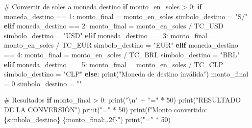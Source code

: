 \documentclass[
  doc,
  floatsintext,
  longtable,
  a4paper,
  nolmodern,
  notxfonts,
  notimes,
  12pt,
  colorlinks=true,linkcolor=blue,citecolor=blue,urlcolor=blue]{apa7}
\newenvironment{Shaded}{\begin{snugshade}}{\end{snugshade}}
\newcommand{\BuiltInTok}[1]{\textcolor[rgb]{0.00,0.23,0.31}{#1}}
\newcommand{\CharTok}[1]{\textcolor[rgb]{0.13,0.47,0.30}{#1}}
\newcommand{\CommentTok}[1]{\textcolor[rgb]{0.37,0.37,0.37}{#1}}
\newcommand{\ControlFlowTok}[1]{\textcolor[rgb]{0.00,0.23,0.31}{\textbf{#1}}}
\newcommand{\DecValTok}[1]{\textcolor[rgb]{0.68,0.00,0.00}{#1}}
\newcommand{\NormalTok}[1]{\textcolor[rgb]{0.00,0.23,0.31}{#1}}
\newcommand{\OperatorTok}[1]{\textcolor[rgb]{0.37,0.37,0.37}{#1}}
\newcommand{\SpecialCharTok}[1]{\textcolor[rgb]{0.37,0.37,0.37}{#1}}
\newcommand{\SpecialStringTok}[1]{\textcolor[rgb]{0.13,0.47,0.30}{#1}}
\newcommand{\StringTok}[1]{\textcolor[rgb]{0.13,0.47,0.30}{#1}}
\begin{document}
\begin{Shaded}
\begin{Highlighting}[]
\CommentTok{\# Convertir de soles a moneda destino}
\ControlFlowTok{if}\NormalTok{ monto\_en\_soles }\OperatorTok{\textgreater{}} \DecValTok{0}\NormalTok{:}
    \ControlFlowTok{if}\NormalTok{ moneda\_destino }\OperatorTok{==} \DecValTok{1}\NormalTok{:}
\NormalTok{        monto\_final }\OperatorTok{=}\NormalTok{ monto\_en\_soles}
\NormalTok{        simbolo\_destino }\OperatorTok{=} \StringTok{"S/"}
    \ControlFlowTok{elif}\NormalTok{ moneda\_destino }\OperatorTok{==} \DecValTok{2}\NormalTok{:}
\NormalTok{        monto\_final }\OperatorTok{=}\NormalTok{ monto\_en\_soles }\OperatorTok{/}\NormalTok{ TC\_USD}
\NormalTok{        simbolo\_destino }\OperatorTok{=} \StringTok{"USD"}
    \ControlFlowTok{elif}\NormalTok{ moneda\_destino }\OperatorTok{==} \DecValTok{3}\NormalTok{:}
\NormalTok{        monto\_final }\OperatorTok{=}\NormalTok{ monto\_en\_soles }\OperatorTok{/}\NormalTok{ TC\_EUR}
\NormalTok{        simbolo\_destino }\OperatorTok{=} \StringTok{"EUR"}
    \ControlFlowTok{elif}\NormalTok{ moneda\_destino }\OperatorTok{==} \DecValTok{4}\NormalTok{:}
\NormalTok{        monto\_final }\OperatorTok{=}\NormalTok{ monto\_en\_soles }\OperatorTok{/}\NormalTok{ TC\_BRL}
\NormalTok{        simbolo\_destino }\OperatorTok{=} \StringTok{"BRL"}
    \ControlFlowTok{elif}\NormalTok{ moneda\_destino }\OperatorTok{==} \DecValTok{5}\NormalTok{:}
\NormalTok{        monto\_final }\OperatorTok{=}\NormalTok{ monto\_en\_soles }\OperatorTok{/}\NormalTok{ TC\_CLP}
\NormalTok{        simbolo\_destino }\OperatorTok{=} \StringTok{"CLP"}
    \ControlFlowTok{else}\NormalTok{:}
        \BuiltInTok{print}\NormalTok{(}\StringTok{"Moneda de destino inválida"}\NormalTok{)}
\NormalTok{        monto\_final }\OperatorTok{=} \DecValTok{0}
\NormalTok{        simbolo\_destino }\OperatorTok{=} \StringTok{""}

    \CommentTok{\# Resultados}
    \ControlFlowTok{if}\NormalTok{ monto\_final }\OperatorTok{\textgreater{}} \DecValTok{0}\NormalTok{:}
        \BuiltInTok{print}\NormalTok{(}\StringTok{"}\CharTok{\textbackslash{}n}\StringTok{"} \OperatorTok{+} \StringTok{"="} \OperatorTok{*} \DecValTok{50}\NormalTok{)}
        \BuiltInTok{print}\NormalTok{(}\StringTok{"RESULTADO DE LA CONVERSIÓN"}\NormalTok{)}
        \BuiltInTok{print}\NormalTok{(}\StringTok{"="} \OperatorTok{*} \DecValTok{50}\NormalTok{)}
        \BuiltInTok{print}\NormalTok{(}\SpecialStringTok{f"Monto convertido: }\SpecialCharTok{\{}\NormalTok{simbolo\_destino}\SpecialCharTok{\}}\SpecialStringTok{ }\SpecialCharTok{\{}\NormalTok{monto\_final}\SpecialCharTok{:,.2f\}}\SpecialStringTok{"}\NormalTok{)}
        \BuiltInTok{print}\NormalTok{(}\StringTok{"="} \OperatorTok{*} \DecValTok{50}\NormalTok{)}
\end{Highlighting}
\end{Shaded}
\end{document}
